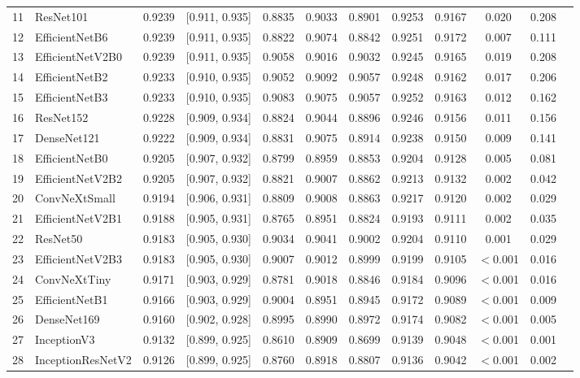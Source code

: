 \begin{table}[p]
{\begin{tabular}{rlccccccccrr}
11 & ResNet101 & 0.9239 & [0.911, 0.935] & 0.8835 & 0.9033 & 0.8901 & 0.9253 & 0.9167 & 0.020 & 0.208 \\
12 & EfficientNetB6 & 0.9239 & [0.911, 0.935] & 0.8822 & 0.9074 & 0.8842 & 0.9251 & 0.9172 & 0.007 & 0.111 \\
13 & EfficientNetV2B0 & 0.9239 & [0.911, 0.935] & 0.9058 & 0.9016 & 0.9032 & 0.9245 & 0.9165 & 0.019 & 0.208 \\
14 & EfficientNetB2 & 0.9233 & [0.910, 0.935] & 0.9052 & 0.9092 & 0.9057 & 0.9248 & 0.9162 & 0.017 & 0.206 \\
15 & EfficientNetB3 & 0.9233 & [0.910, 0.935] & 0.9083 & 0.9075 & 0.9057 & 0.9252 & 0.9163 & 0.012 & 0.162 \\
16 & ResNet152 & 0.9228 & [0.909, 0.934] & 0.8824 & 0.9044 & 0.8896 & 0.9246 & 0.9156 & 0.011 & 0.156 \\
17 & DenseNet121 & 0.9222 & [0.909, 0.934] & 0.8831 & 0.9075 & 0.8914 & 0.9238 & 0.9150 & 0.009 & 0.141 \\
18 & EfficientNetB0 & 0.9205 & [0.907, 0.932] & 0.8799 & 0.8959 & 0.8853 & 0.9204 & 0.9128 & 0.005 & 0.081 \\
\midrule
19 & EfficientNetV2B2 & 0.9205 & [0.907, 0.932] & 0.8821 & 0.9007 & 0.8862 & 0.9213 & 0.9132 & 0.002 & 0.042 \\
20 & ConvNeXtSmall & 0.9194 & [0.906, 0.931] & 0.8809 & 0.9008 & 0.8863 & 0.9217 & 0.9120 & 0.002 & 0.029 \\
21 & EfficientNetV2B1 & 0.9188 & [0.905, 0.931] & 0.8765 & 0.8951 & 0.8824 & 0.9193 & 0.9111 & 0.002 & 0.035 \\
22 & ResNet50 & 0.9183 & [0.905, 0.930] & 0.9034 & 0.9041 & 0.9002 & 0.9204 & 0.9110 & 0.001 & 0.029 \\
23 & EfficientNetV2B3 & 0.9183 & [0.905, 0.930] & 0.9007 & 0.9012 & 0.8999 & 0.9199 & 0.9105 & $<$0.001 & 0.016 \\
24 & ConvNeXtTiny & 0.9171 & [0.903, 0.929] & 0.8781 & 0.9018 & 0.8846 & 0.9184 & 0.9096 & $<$0.001 & 0.016 \\
25 & EfficientNetB1 & 0.9166 & [0.903, 0.929] & 0.9004 & 0.8951 & 0.8945 & 0.9172 & 0.9089 & $<$0.001 & 0.009 \\
26 & DenseNet169 & 0.9160 & [0.902, 0.928] & 0.8995 & 0.8990 & 0.8972 & 0.9174 & 0.9082 & $<$0.001 & 0.005 \\
27 & InceptionV3 & 0.9132 & [0.899, 0.925] & 0.8610 & 0.8909 & 0.8699 & 0.9139 & 0.9048 & $<$0.001 & 0.001 \\
28 & InceptionResNetV2 & 0.9126 & [0.899, 0.925] & 0.8760 & 0.8918 & 0.8807 & 0.9136 & 0.9042 & $<$0.001 & 0.002 \\

\end{tabular}}
\end{table}
